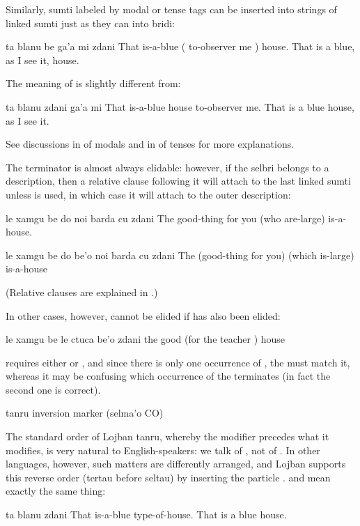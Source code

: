 Similarly, sumti labeled by modal or tense tags can be inserted
    into strings of linked sumti just as they can into bridi:
\begin{example}
ta blanu be ga'a mi  zdani\n
That is-a-blue ( to-observer me ) house.\n
That is a blue, as I see it, house.
\end{example}

The meaning of  is slightly
    different from:
\begin{example}
ta blanu zdani ga'a mi\n
That is-a-blue house to-observer me.\n
That is a blue house, as I see it.
\end{example}

See discussions in  of
    modals and in  of tenses
    for more explanations.

The terminator  is almost always elidable: however,
    if the selbri belongs to a description, then a relative clause
    following it will attach to the last linked sumti unless
     is used, in which case it will attach to the outer
    description:
\begin{example}
le xamgu be do noi barda cu zdani\n
The good-thing for you (who are-large) is-a-house.
\end{example}

\begin{example}
le xamgu be do be'o noi barda cu zdani\n
The (good-thing for you) (which is-large) is-a-house
\end{example}

(Relative clauses are explained in .) 

In other cases, however,  cannot be elided if 
    has also been elided:
\begin{example}
le xamgu be le ctuca  be'o zdani\n
the good (for the teacher ) house
\end{example}

{\noindent}requires either  or , and since there is only one
    occurrence of , the  must match it, whereas it
    may be confusing which occurrence of  the 
    terminates (in fact the second one is correct).



\begin{description}
\item[co] tanru inversion marker (selma'o CO)
\end{description}
    The standard order of Lojban tanru, whereby the modifier
    precedes what it modifies, is very natural to English-speakers:
    we talk of , not of . In other
    languages, however, such matters are differently arranged, and
    Lojban supports this reverse order (tertau before seltau) by
    inserting the particle . 
    and  mean exactly the same
    thing:
\begin{example}
ta blanu zdani\n
That is-a-blue type-of-house.\n
That is a blue house.
\end{example}

